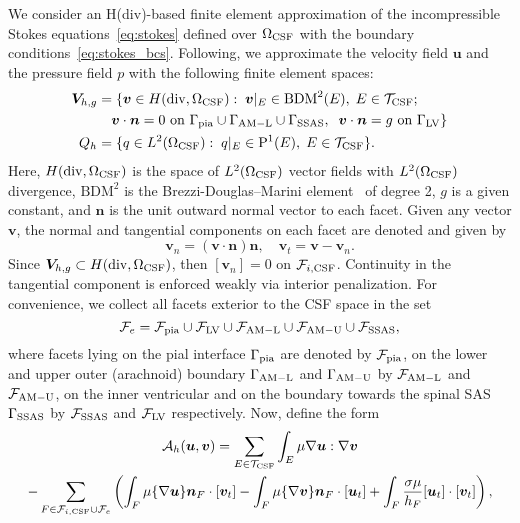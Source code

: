 \documentclass[11pt, dvipsnames]{amsart}
\begin{document}
We consider an H(div)-based finite element approximation of the incompressible Stokes equations~\eqref{eq:stokes} defined over $\Omega_{\rm CSF}$ with the boundary conditions~\eqref{eq:stokes_bcs}. Following\cite{hong2016robust}, we approximate the velocity field $\bm u$ and the pressure field $p$ with the following finite element spaces:
\begin{align*}
  \bm V_{h,g} &= \{ \bm v  \in H(\mathrm{div}, \Omega_{\mathrm{CSF}}): \;
  \bm v \vert_{E} \in \mathrm{BDM}^2(E), \; E \in \mathcal{T}_{\rm CSF}; \; \\ & \quad 
  \bm v \cdot \bm n = 0
  \text{ on } \Gamma_{\rm{pia}} \cup \Gamma_{\rm AM-L} \cup \Gamma_{\rm{SSAS}}, \;\; \bm v \cdot \bm n =  g %
  \text{ on } \Gamma_{\mathrm{LV}} \}  \\ 
  Q_h  &= \{q \in L^2(\Omega_{\rm CSF}): \; q \vert_E \in \mathrm{P}^1(E),
  \; E \in \mathcal{T}_{\rm CSF} \}. 
\end{align*}
Here, $H(\mathrm{div}, \Omega_{\rm{CSF}})$ is the space of $L^2(\Omega_{\rm{CSF}})$ vector fields with $L^2(\Omega_{\rm{CSF}})$ divergence, $\mathrm{BDM}^2$ is the Brezzi-Douglas--Marini element~\cite{brezzi1987mixed} of degree 2, $g$ is a given constant, and $\bm n$ is the unit outward normal vector to each facet. Given any vector $\bm v$, the normal and tangential components on each facet are denoted and given by 
\begin{equation}
\bm v_n = (\bm v \cdot \bm n) \bm n, \quad \bm v_t = \bm v - \bm v_n. 
\end{equation}
Since $\bm V_{h,g} \subset H(\mathrm{div}, \Omega_{\rm CSF})$, then $[\bm
  v_n] = 0 $ on $\mathcal{F}_{i, \rm CSF}$. Continuity in the
tangential component is enforced weakly via interior penalization. For
convenience, we collect all facets exterior to the CSF space in  the set
$$\mathcal{F}_{e} = \mathcal{F}_{\rm pia} \cup \mathcal{F}_{\rm LV}
\cup \mathcal{F}_{\rm AM-L}\cup \mathcal{F}_{\rm AM-U}  \cup \mathcal{F}_{\rm SSAS}, $$ where facets
lying on the pial interface $\Gamma_{\rm pia}$ are denoted by
$\mathcal{F}_{\rm pia}$, on the lower and upper outer (arachnoid) boundary
$\Gamma_{\rm AM-L}$ and $\Gamma_{\rm AM-U}$ by $\mathcal{F}_{\rm AM-L}$ and $\mathcal{F}_{\rm AM-U}$, on the inner ventricular
and on the boundary towards the spinal SAS $\Gamma_{\rm SSAS}$ by
$\mathcal{F}_{\rm SSAS}$ and $\mathcal{F}_{\rm LV}$ respectively. Now, define the form 
\begin{multline}
  \mathcal{A}_h(\bm u, \bm v)
  = \sum_{E \in \mathcal{T}_{\rm CSF}} \int_{E} \mu \nabla \bm u : \nabla \bm v
 \\  - \sum_{F \in \mathcal{F}_{i, \rm CSF} \cup \mathcal{F}_{e}} \left (
  \int_{F} \mu \{\nabla \bm u\}  \bm n_F \cdot [\bm v_t] 
  - %
  \int_{F} \mu \{\nabla \bm v\} \bm n_F \cdot [\bm u_t]
  + %
\int_{F}   \frac{\sigma \mu}{h_F} [\bm u_t ] \cdot [\bm v_t] \right ),   
\end{multline}
\end{document}
